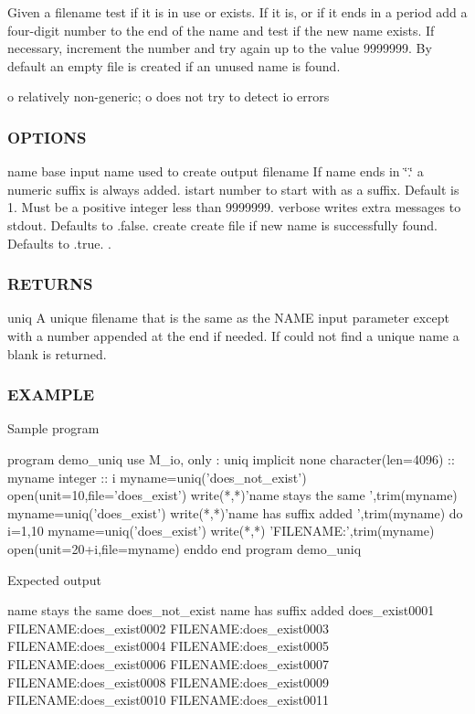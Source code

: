 Given a filename test if it is in use or exists. If it is, or if it ends in a period add a four-\/digit number to the end of the name and test if the new name exists. If necessary, increment the number and try again up to the value 9999999. By default an empty file is created if an unused name is found.

o relatively non-\/generic; o does not try to detect io errors

\subsubsection*{O\+P\+T\+I\+O\+NS}

name base input name used to create output filename If name ends in \char`\"{}.\char`\"{} a numeric suffix is always added. istart number to start with as a suffix. Default is 1. Must be a positive integer less than 9999999. verbose writes extra messages to stdout. Defaults to .false. create create file if new name is successfully found. Defaults to .true. .

\subsubsection*{R\+E\+T\+U\+R\+NS}

uniq A unique filename that is the same as the N\+A\+ME input parameter except with a number appended at the end if needed. If could not find a unique name a blank is returned.

\subsubsection*{E\+X\+A\+M\+P\+LE}

\begin{DoxyVerb}Sample program

   program demo_uniq
   use M_io, only : uniq
   implicit none
   character(len=4096) :: myname
   integer             :: i
      myname=uniq('does_not_exist')
      open(unit=10,file='does_exist')
      write(*,*)'name stays the same ',trim(myname)
      myname=uniq('does_exist')
      write(*,*)'name has suffix added ',trim(myname)
      do i=1,10
         myname=uniq('does_exist')
         write(*,*) 'FILENAME:',trim(myname)
         open(unit=20+i,file=myname)
      enddo
   end program demo_uniq

Expected output

 name stays the same does_not_exist
 name has suffix added does_exist0001
 FILENAME:does_exist0002
 FILENAME:does_exist0003
 FILENAME:does_exist0004
 FILENAME:does_exist0005
 FILENAME:does_exist0006
 FILENAME:does_exist0007
 FILENAME:does_exist0008
 FILENAME:does_exist0009
 FILENAME:does_exist0010
 FILENAME:does_exist0011
\end{DoxyVerb}


